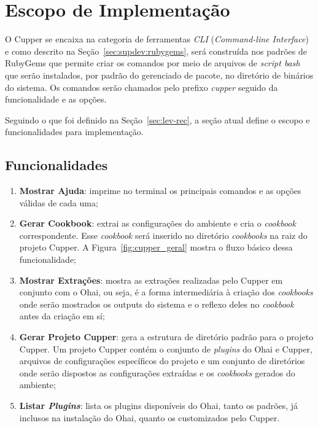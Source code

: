 \section{Escopo de Implementação}
\label{sec:escopo}


O Cupper se encaixa na categoria de ferramentas \textit{CLI} (\textit{Command-line Interface})
e como descrito na Seção~\ref{sec:supdev:rubygems}, será construída nos padrões de
RubyGems que permite criar os comandos por meio de arquivos de \textit{script bash}
que serão instalados, por padrão do gerenciado de pacote, no diretório de binários do sistema.
Os comandos serão chamados pelo prefixo \textit{cupper} seguido da funcionalidade e as opções.


Seguindo o que foi definido na Seção~\ref{sec:lev-rec}, a seção atual define
o escopo e funcionalidades para implementação.

\subsection{Funcionalidades}

\begin{enumerate}
  \item \textbf{Mostrar Ajuda}: imprime no terminal os principais comandos e as opções válidas de
    cada uma;

  \item \textbf{Gerar Cookbook}: extrai as configurações do ambiente e cria o \textit{cookbook} correspondente.
    Esse \textit{cookbook} será inserido no diretório \textit{cookbooks} na raiz do projeto Cupper.
    A Figura~\ref{fig:cupper_geral} mostra o fluxo básico dessa funcionalidade;

  \item \textbf{Mostrar Extrações}: mostra as extrações realizadas pelo Cupper em conjunto com o Ohai,
    ou seja, é a forma intermediária à criação dos \textit{cookbooks} onde serão mostrados os outputs do
    sistema e o reflexo deles no \textit{cookbook} antes da criação em sí;

  \item \textbf{Gerar Projeto Cupper}: gera a estrutura de diretório padrão para o projeto Cupper.
    Um projeto Cupper contém o conjunto de \textit{plugins} do Ohai e Cupper, arquivos de configurações
    específicos do projeto e um conjunto de diretórios onde serão dispostos as configurações
    extraídas e os \textit{cookbooks} gerados do ambiente;

  \item \textbf{Listar \textit{Plugins}}: lista os plugins disponíveis do Ohai, tanto os padrões, já inclusos
    na instalação do Ohai, quanto os customizados pelo Cupper.

\end{enumerate}
